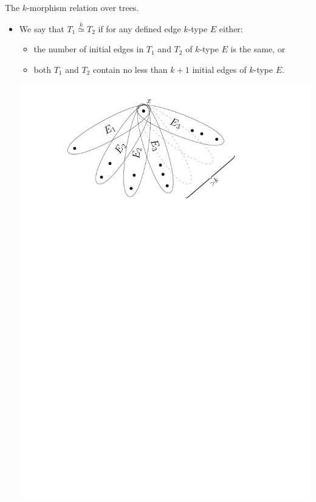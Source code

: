 \documentclass[11pt]{beamer}
\newcommand{\clist}{\mathfrak{c}_{1}, \cdots, \mathfrak{c}_m}
\newcommand{\morph}[1]{\stackrel{#1}{\simeq}}
\begin{document}
	\begin{frame}{The $k$-morphism relation over trees.}
		\begin{itemize}
		\item We say that $T_1\morph{k}T_2$ if
		for any defined edge $k$-type $E$ either:
		\begin{itemize}
			\vspace{0.2 em}
			\item the number of initial edges in $T_1$ and $T_2$ of $k$-type $E$ 
			is the same, or
			\vspace{0.2 em}
			\item both $T_1$ and $T_2$ contain no less than $k+1$
			initial edges of $k$-type $E$. 
		\end{itemize}
		\begin{center}
			\includegraphics[width=0.7\linewidth]{Try.pdf}
		\end{center}
			
		\end{itemize}
	\end{frame}
%
\end{document}
